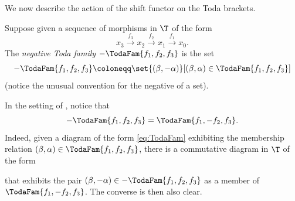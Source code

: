 \documentclass[a4paper]{amsart}
\begin{document}
We now describe the action of the shift functor on the Toda brackets.

\begin{definition}[{\cite[p.~2709]{CF17}}]
  \label{def:negative_TodaFam}
  Suppose given a sequence of morphisms in $\T$ of the form
  \[
    x_3\xrightarrow{f_3}x_2\xrightarrow{f_2}x_1\xrightarrow{f_1}x_0.
  \]
  The \emph{negative Toda family $-\TodaFam{f_1,f_2,f_3}$} is the set
  \[
    -\TodaFam{f_1,f_2,f_3}\coloneqq\set{(\beta,-\alpha)}[(\beta,\alpha)\in\TodaFam{f_1,f_2,f_3}]
  \]
  (notice the unusual convention for the negative of a set).
\end{definition}

\begin{remark}
  \label{rmk:negative_TodaFam}
  In the setting of , notice that
  \[
    -\TodaFam{f_1,f_2,f_3}=\TodaFam{f_1,-f_2,f_3}.
  \]
  Indeed, given a diagram of the form \eqref{eq:TodaFam} exhibiting the
  membership relation $(\beta,\alpha)\in\TodaFam{f_1,f_2,f_3}$, there is a
  commutative diagram in $\T$ of the form
  \begin{center}
  \end{center}
  that exhibits the pair $(\beta,-\alpha)\in-\TodaFam{f_1,f_2,f_3}$ as a member
  of $\TodaFam{f_1,-f_2,f_3}$. The converse is then also clear.
\end{remark}
\end{document}

